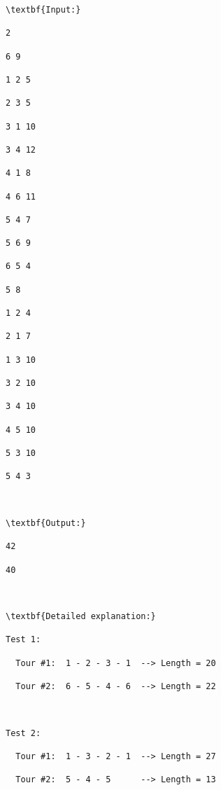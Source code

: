 \begin{verbatim}
\textbf{Input:}

2

6 9

1 2 5

2 3 5

3 1 10

3 4 12

4 1 8

4 6 11

5 4 7

5 6 9

6 5 4

5 8

1 2 4

2 1 7

1 3 10

3 2 10

3 4 10

4 5 10

5 3 10

5 4 3



\textbf{Output:}

42

40



\textbf{Detailed explanation:}

Test 1:

  Tour #1:  1 - 2 - 3 - 1  --> Length = 20

  Tour #2:  6 - 5 - 4 - 6  --> Length = 22



Test 2:

  Tour #1:  1 - 3 - 2 - 1  --> Length = 27

  Tour #2:  5 - 4 - 5      --> Length = 13



\end{verbatim}